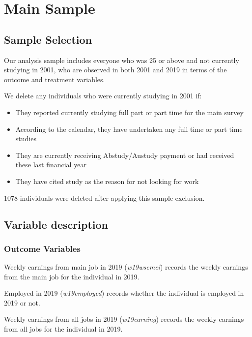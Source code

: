 \documentclass[12pt, a4paper]{article}
\begin{document}
\clearpage

\renewcommand{\appendixname}{Online Appendix}

\section{Main Sample}

\subsection{Sample Selection}

Our analysis sample includes everyone who was 25 or above and not currently studying in 2001, who are observed in both 2001 and 2019 in terms of the outcome and treatment variables. 

We delete any individuals who were currently studying in 2001 if:
\begin{itemize}
  \item They reported currently studying full part or part time for the main survey 
  \item According to the calendar, they have undertaken any full time or part time studies
  \item They are currently receiving Abstudy/Austudy payment or had received these last financial year 
  \item They have cited study as the reason for not looking for work 
\end{itemize}

1078 individuals were deleted after applying this sample exclusion.

\subsection{Variable description}

\subsubsection{Outcome Variables}
Weekly earnings from main job in 2019 (\textit{w19\textunderscore{}wscmei}) records the weekly earnings from the main job for the individual in 2019. 

Employed in 2019 (\textit{w19\textunderscore{}employed}) records whether the individual is employed in 2019 or not. 

Weekly earnings from all jobs in 2019 (\textit{w19\textunderscore{}earning}) records the weekly earnings from all jobs for the individual in 2019. 
\end{document}
